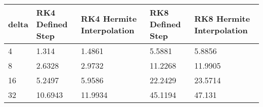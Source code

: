 \begin{tabular}{lllll}
delta & RK4 Defined Step & RK4 Hermite Interpolation & RK8 Defined Step & RK8 Hermite Interpolation \\ 
\hline 
4 & 1.314 & 1.4861 & 5.5881 & 5.8856 \\ 
8 & 2.6328 & 2.9732 & 11.2268 & 11.9905 \\ 
16 & 5.2497 & 5.9586 & 22.2429 & 23.5714 \\ 
32 & 10.6943 & 11.9934 & 45.1194 & 47.131 \\ 
\hline 
\end{tabular}